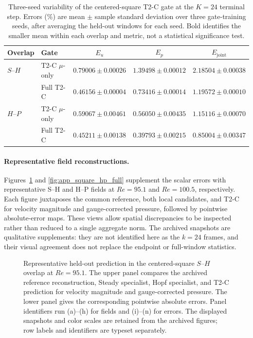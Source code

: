 \begin{table}[H]
\centering
\caption{
Three-seed variability of the centered-square T2-C gate at the $K=24$
terminal step. Errors (\%) are mean $\pm$ sample standard deviation
over three gate-training seeds, after averaging the held-out windows
for each seed. Bold identifies the smaller mean within each overlap
and metric, not a statistical significance test.
}
\label{tab:t2c_seed_variability}
\small
\setlength{\tabcolsep}{4pt}
\begin{tabular}{@{}llccc@{}}
\toprule
Overlap & Gate & $E_u$ & $E_p$ & $E_{\mathrm{joint}}$ \\
\midrule
$S$--$H$ & T2-C $\mu$-only & $0.79006\pm0.00026$ & $1.39498\pm0.00012$ & $2.18504\pm0.00038$ \\
 & Full T2-C & $\mathbf{0.46156\pm0.00004}$ & $\mathbf{0.73416\pm0.00014}$ & $\mathbf{1.19572\pm0.00010}$ \\
\midrule
$H$--$P$ & T2-C $\mu$-only & $0.59067\pm0.00461$ & $0.56050\pm0.00435$ & $1.15116\pm0.00070$ \\
 & Full T2-C & $\mathbf{0.45211\pm0.00138}$ & $\mathbf{0.39793\pm0.00215}$ & $\mathbf{0.85004\pm0.00347}$ \\
\bottomrule
\end{tabular}
\end{table}

\paragraph{Representative field reconstructions.}
Figures~\ref{fig:app_square_sh_full} and \ref{fig:app_square_hp_full}
supplement the scalar errors with representative S--H and H--P fields
at $Re=95.1$ and $Re=100.5$, respectively.
Each figure juxtaposes the common reference, both local candidates,
and T2-C for velocity magnitude and gauge-corrected pressure, followed
by pointwise absolute-error maps. These views allow spatial discrepancies
to be inspected rather than reduced to a single aggregate norm.
The archived snapshots are qualitative supplements: they are not
identified here as the $k=24$ frames, and their visual agreement
does not replace the endpoint or full-window statistics.

\begin{figure}[p]
\centering
{}

\vspace{0.35em}
\caption{Representative held-out prediction in the centered-square
$S$--$H$ overlap at $Re=95.1$. The upper panel compares the archived reference reconstruction,
Steady specialist, Hopf specialist, and T2-C prediction for velocity
magnitude and gauge-corrected pressure. The lower panel gives the
corresponding pointwise absolute errors. Panel identifiers run (a)--(h) for fields and (i)--(n) for errors. The displayed snapshots and color scales are retained from the archived figures; row labels and identifiers are typeset separately.}
\label{fig:app_square_sh_full}
\end{figure}

